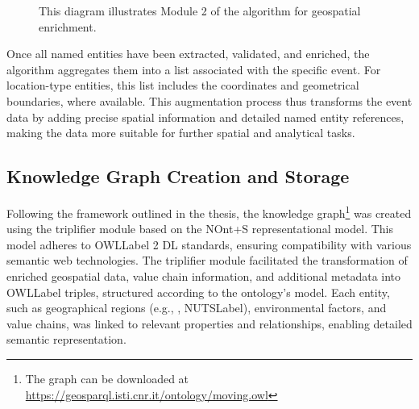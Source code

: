 \begin{figure}
\caption{This diagram illustrates Module 2 of the algorithm for geospatial enrichment.}
\label{fig:alg1}
\end{figure}

Once all named entities have been extracted, validated, and enriched, the algorithm aggregates them into a list associated with the specific event. For location-type entities, this list includes the coordinates and geometrical boundaries, where available. This augmentation process thus transforms the event data by adding precise spatial information and detailed named entity references, making the data more suitable for further spatial and analytical tasks.

\subsection{Knowledge Graph Creation and Storage}\label{VII-subsec:moving-kg}
Following the framework outlined in the thesis, the knowledge graph\footnote{The graph can be downloaded at \url{https://geosparql.isti.cnr.it/ontology/moving.owl}} was created using the triplifier module based on the NOnt+S representational model. This model adheres to \acrshort{OWLLabel} 2 DL \cite{OWLWebOntologyc} standards, ensuring compatibility with various semantic web technologies. The triplifier module facilitated the transformation of enriched geospatial data, value chain information, and additional metadata into \acrshort{OWLLabel} triples, structured according to the ontology’s model. Each entity, such as geographical regions (e.g., , \acrshort{NUTSLabel}), environmental factors, and value chains, was linked to relevant properties and relationships, enabling detailed semantic representation.


